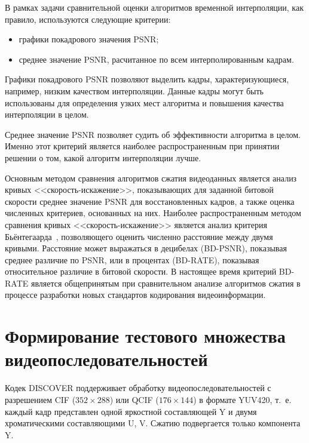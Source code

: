 В рамках задачи сравнительной оценки алгоритмов временной интерполяции, как правило, используются следующие критерии:
\begin{itemize}
    \item графики покадрового значения PSNR;
    \item среднее значение PSNR, расчитанное по всем интерполированным кадрам.
\end{itemize}

Графики покадрового PSNR позволяют выделить кадры, характеризующиеся, например, низким качеством интерполяции. Данные кадры могут быть использованы для определения узких мест алгоритма и повышения качества интерполяции в целом.

Среднее значение PSNR позволяет судить об эффективности алгоритма в целом. Именно этот критерий является наиболее распространенным при принятии решении о том, какой алгоритм интерполяции лучше.

Основным методом сравнения алгоритмов сжатия видеоданных является анализ кривых <<скорость-искажение>>, показывающих для заданной битовой скорости среднее значение PSNR для восстановленных кадров, а также оценка численных критериев, основанных на них. Наиболее распространенным методом сравнения кривых <<скорость-искажение>> является анализ критерия Бьёнтегаарда~\cite{Bjontegaard2001}, позволяющего оценить численно расстояние между двумя кривыми. Расстояние может выражаться в децибелах (BD-PSNR), показывая среднее различие по PSNR, или в процентах (BD-RATE), показывая относительное различие в битовой скорости. В настоящее время критерий BD-RATE является общепринятым при сравнительном анализе алгоритмов сжатия в процессе разработки новых стандартов кодирования видеоинформации.

\section{Формирование тестового множества видеопоследовательностей}
\label{chap:ExpResults:SchemeofExperiment:TestSet}

Кодек DISCOVER поддерживает обработку видеопоследовательностей с разрешением CIF ($352\times288$) или QCIF ($176\times144$) в формате YUV420, т.~е. каждый кадр представлен одной яркостной составляющей Y и двумя хроматическими составляющими U, V. Сжатию подвергается только компонента Y.

